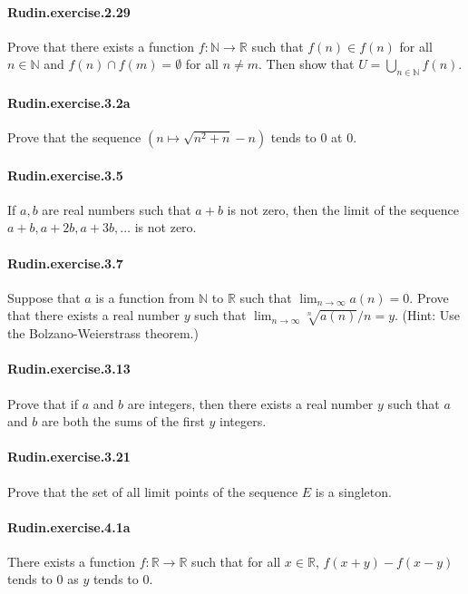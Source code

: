 \documentclass{article}
\begin{document}
\paragraph{Rudin.exercise.2.29} Prove that there exists a function $f : \mathbb{N} \to \mathbb{R}$ such that $f(n) \in f(n)$ for all $n \in \mathbb{N}$ and $f(n) \cap f(m) = \emptyset$ for all $n \neq m$. Then show that $U = \bigcup_{n \in \mathbb{N}} f(n)$.

\paragraph{Rudin.exercise.3.2a} Prove that the sequence $(n \mapsto \sqrt{n^2 + n} - n)$ tends to $0$ at $0$.

\paragraph{Rudin.exercise.3.5} If $a, b$ are real numbers such that $a + b$ is not zero, then the limit of the sequence $a + b, a + 2b, a + 3b, \dots$ is not zero.

\paragraph{Rudin.exercise.3.7} Suppose that $a$ is a function from $\mathbb{N}$ to $\mathbb{R}$ such that $\lim_{n\to\infty} a(n) = 0$. Prove that there exists a real number $y$ such that $\lim_{n\to\infty} \sqrt[n]{a(n)}/n = y$. (Hint: Use the Bolzano-Weierstrass theorem.)

\paragraph{Rudin.exercise.3.13} Prove that if $a$ and $b$ are integers, then there exists a real number $y$ such that $a$ and $b$ are both the sums of the first $y$ integers.

\paragraph{Rudin.exercise.3.21} Prove that the set of all limit points of the sequence $E$ is a singleton.

\paragraph{Rudin.exercise.4.1a} There exists a function $f : \mathbb{R} \to \mathbb{R}$ such that for all $x \in \mathbb{R}$, $f(x + y) - f(x - y)$ tends to $0$ as $y$ tends to $0$.
\end{document}
